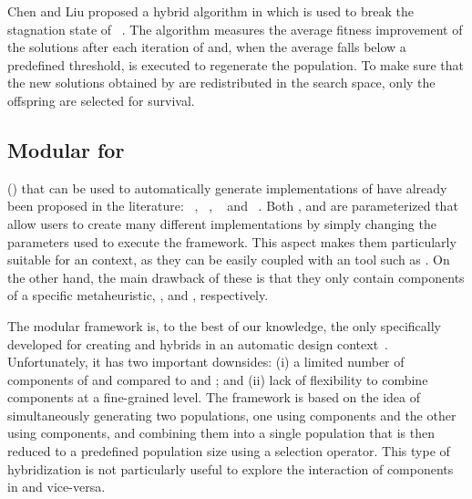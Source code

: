 Chen and Liu proposed a hybrid algorithm in which \DE is used to break the stagnation state of \CMAES~\cite{CheLiu22:nature-scirep}.
The algorithm measures the average fitness improvement of the solutions after each iteration of \CMAES and, when the average falls below a predefined threshold, \DE is executed to regenerate the population. 
To make sure that the new solutions obtained by \DE are redistributed in the search space, only the offspring are selected for survival.


\subsection{Modular \msfs for \algInPaper}
\Msfs (\MSFs) that can be used to automatically generate implementations of \algInPaper have already been proposed in the literature: \PSOX~\cite{CamDorStu2022:tec}, \aCMAES~\cite{deNVerWan2021:gecco-CMAESframework}, \aDE~\cite{VerCarKon2023:autoDE:gecco} and \modPSODE~\cite{BokWanBac2020:gecco-PSO-DE}. %
Both \PSOX, \aCMAES and \aDE are parameterized \MSFs that allow users to create many different implementations by simply changing the parameters used to execute the framework. 
This aspect makes them particularly suitable for an \ad context, as they can be easily coupled with an \AACT tool such as \irace.
On the other hand, the main drawback of these \MSFs is that they only contain components of a specific metaheuristic, \PSO, \CMAES and \DE, respectively.

The modular \modPSODE framework is, to the best of our knowledge, the only \MSF specifically developed for creating \PSO and \DE hybrids in an automatic design context~\cite{BokWanBac2020:gecco-PSO-DE}.
Unfortunately, it has two important downsides: (i) a limited number of components of \PSO and \DE compared to \PSOX and \aDE; and (ii) lack of flexibility to combine components at a fine-grained level.
The \modPSODE framework is based on the idea of simultaneously generating two populations, one using \PSO components and the other using \DE components, and combining them into a single population that is then reduced to a predefined population size using a selection operator.
This type of hybridization is not particularly useful to explore the interaction of \PSO components in \DE and vice-versa.%
